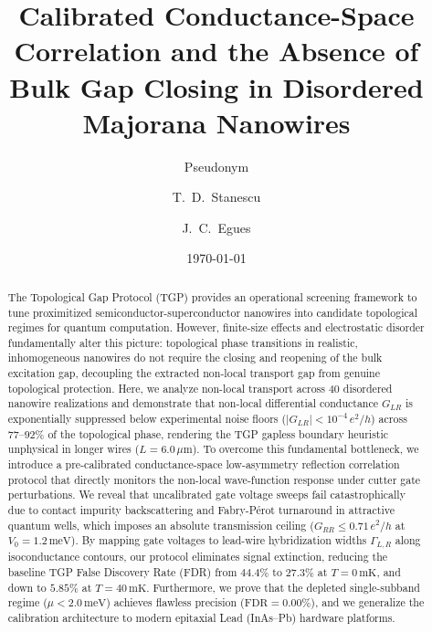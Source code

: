 \documentclass[aps,prb,reprint,superscriptaddress,amsmath,amssymb,floatfix]{revtex4-2}
\begin{document}
\title{Calibrated Conductance-Space Correlation and the Absence of Bulk Gap Closing in Disordered Majorana Nanowires}

\author{Pseudonym}

\author{T.~D.~Stanescu}

\author{J.~C.~Egues}

\date{\today}

\begin{abstract}
The Topological Gap Protocol (TGP) provides an operational screening framework to tune proximitized semiconductor-superconductor nanowires into candidate topological regimes for quantum computation. However, finite-size effects and electrostatic disorder fundamentally alter this picture: topological phase transitions in realistic, inhomogeneous nanowires do not require the closing and reopening of the bulk excitation gap, decoupling the extracted non-local transport gap from genuine topological protection. Here, we analyze non-local transport across 40 disordered nanowire realizations and demonstrate that non-local differential conductance $G_{LR}$ is exponentially suppressed below experimental noise floors ($|G_{LR}| < 10^{-4}\,e^2/h$) across $77\text{--}92\%$ of the topological phase, rendering the TGP gapless boundary heuristic unphysical in longer wires ($L = 6.0\,\mu\text{m}$). To overcome this fundamental bottleneck, we introduce a pre-calibrated conductance-space low-asymmetry reflection correlation protocol that directly monitors the non-local wave-function response under cutter gate perturbations. We reveal that uncalibrated gate voltage sweeps fail catastrophically due to contact impurity backscattering and Fabry-P\'erot turnaround in attractive quantum wells, which imposes an absolute transmission ceiling ($G_{RR} \le 0.71\,e^2/h$ at $V_0 = 1.2\,\text{meV}$). By mapping gate voltages to lead-wire hybridization widths $\Gamma_{L,R}$ along isoconductance contours, our protocol eliminates signal extinction, reducing the baseline TGP False Discovery Rate (FDR) from $44.4\%$ to $27.3\%$ at $T = 0\,\text{mK}$, and down to $5.85\%$ at $T = 40\,\text{mK}$. Furthermore, we prove that the depleted single-subband regime ($\mu < 2.0\,\text{meV}$) achieves flawless precision ($\text{FDR} = 0.00\%$), and we generalize the calibration architecture to modern epitaxial Lead (InAs--Pb) hardware platforms.
\end{abstract}
\end{document}
